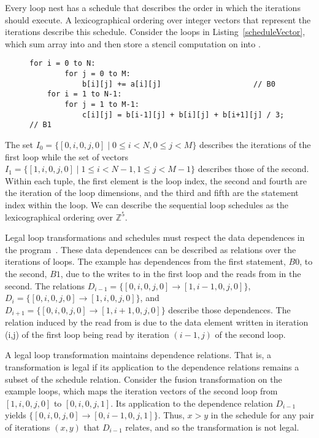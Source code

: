 Every loop nest has a schedule that describes the order in which the 
iterations should execute.
A lexicographical ordering over integer vectors that represent the
iterations describe this schedule.
Consider the loops in Listing~\ref{scheduleVector}, which sum array
 into  and then store a stencil computation on 
into .

\begin{figure}[t]
	\begin{lstlisting}[label={scheduleVector},caption={Example Loop Chain}]
	for i = 0 to N:
		for j = 0 to M:
			b[i][j] += a[i][j]                     // B0
	for i = 1 to N-1:
		for j = 1 to M-1:
			c[i][j] = b[i-1][j] + b[i][j] + b[i+1][j] / 3;     // B1
	\end{lstlisting}
	\end{figure}


The set $I_{0}=\{[0,i,0,j,0] \; | \; 0 \leq i < N, 0 \leq j < M\}$ describes
the iterations of the first loop while the set of vectors
$I_{1} = \{[1,i,0,j,0] \; | \; 1 \leq i < N-1, 1 \leq j < M-1\}$ describes
those of the second.
Within each tuple, the first element is the loop index, the second and fourth are the iteration of the loop dimensions, and the third and fifth are the statement index within the loop. 
We can describe the sequential loop schedules as the lexicographical ordering over
$\mathbb{Z}^{5}$.

Legal loop transformations and schedules must respect the data dependences
in the program~\cite{frameworkKP95pub}.
These data dependences can be described as relations over the iterations 
of loops.
The example has dependences from the first statement, $B0$, to the second,
$B1$, due to the writes to  in the first loop and the reads from
 in the second. 
The relations $D_{i-1} = \{[0,i,0,j,0] \to [1,i-1,0,j,0]\}$,
$D_{i} = \{[0,i,0,j,0] \to [1,i,0,j,0]\}$, and
$D_{i+1} = \{[0,i,0,j,0] \to [1,i+1,0,j,0]\}$ describe those dependences. 
The relation induced by the read from  
is due to the data element written in iteration (i,j) of the
first loop being read by iteration $(i-1,j)$ of the second loop. %

A legal loop transformation maintains dependence relations. 
That is, a transformation is legal if its application to the dependence
relations remains a subset of the schedule relation.
Consider the fusion transformation on the example loops, which maps the
iteration vectors of the second loop from $[1,i,0,j,0]$ to $[0,i,0,j,1]$. 
Its application to the dependence relation $D_{i-1}$ yields
$\{[0,i,0,j,0] \to [0,i-1,0,j,1]\}$.
Thus, $x > y$ in the schedule for any pair of iterations $(x,y)$ that
$D_{i-1}$ relates, and so the transformation is not legal.

